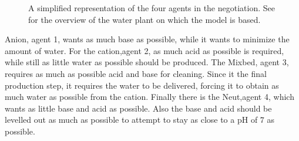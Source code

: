 \begin{figure}[h]
	\centering
	\caption{A simplified representation of the four agents in the negotiation. See  for the overview of the water plant on which the model is based.}
	\label{fig:agent-plant}
\end{figure}
Anion, agent 1, wants as much base as possible, while it wants to minimize the amount of water. For the cation,agent 2, as much acid as possible is required, while still as little water as possible should be produced. The Mixbed, agent 3, requires as much as possible acid and base for cleaning. Since it the final production step, it requires the water to be delivered, forcing it to obtain as much water as possible from the cation. Finally there is the Neut,agent 4, which wants as little base and acid as possible. Also the base and acid should be levelled out as much as possible to attempt to stay as close to a pH of $7$ as possible. 

